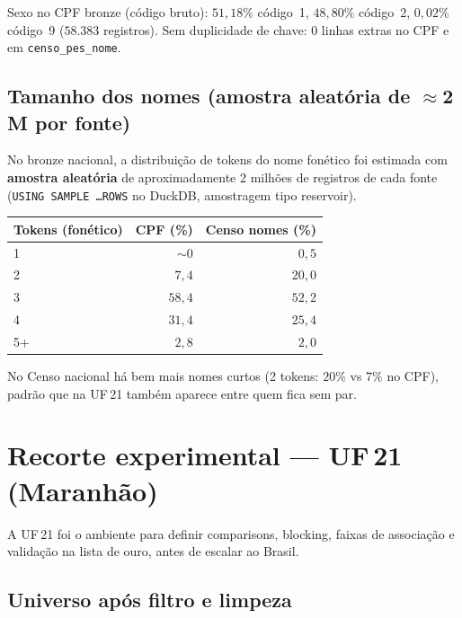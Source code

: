 \documentclass[11pt,a4paper]{article}
\begin{document}
Sexo no CPF bronze (código bruto): $51{,}18\%$ código~1, $48{,}80\%$ código~2,
$0{,}02\%$ código~9 ($58{.}383$ registros). Sem duplicidade de chave: $0$
linhas extras no CPF e em \texttt{censo\_pes\_nome}.

\subsection{Tamanho dos nomes (amostra aleatória de $\approx$2\,M por fonte)}

No bronze nacional, a distribuição de tokens do nome fonético foi estimada
com \textbf{amostra aleatória} de aproximadamente 2 milhões de registros de
cada fonte (\texttt{USING SAMPLE \ldots ROWS} no DuckDB, amostragem tipo
reservoir).

\begin{center}
\begin{tabular}{@{}lrr@{}}
\toprule
Tokens (fonético) & CPF (\%) & Censo nomes (\%) \\
\midrule
1 & $\sim 0$ & $0{,}5$ \\
2 & $7{,}4$ & $20{,}0$ \\
3 & $58{,}4$ & $52{,}2$ \\
4 & $31{,}4$ & $25{,}4$ \\
5+ & $2{,}8$ & $2{,}0$ \\
\bottomrule
\end{tabular}
\end{center}

No Censo nacional há bem mais nomes curtos (2 tokens: $20\%$ vs $7\%$ no CPF),
padrão que na UF\,21 também aparece entre quem fica sem par.

\section{Recorte experimental --- UF\,21 (Maranhão)}

A UF\,21 foi o ambiente para definir comparisons, blocking, faixas de
associação e validação na lista de ouro, antes de escalar ao Brasil.

\subsection{Universo após filtro e limpeza}
\end{document}
